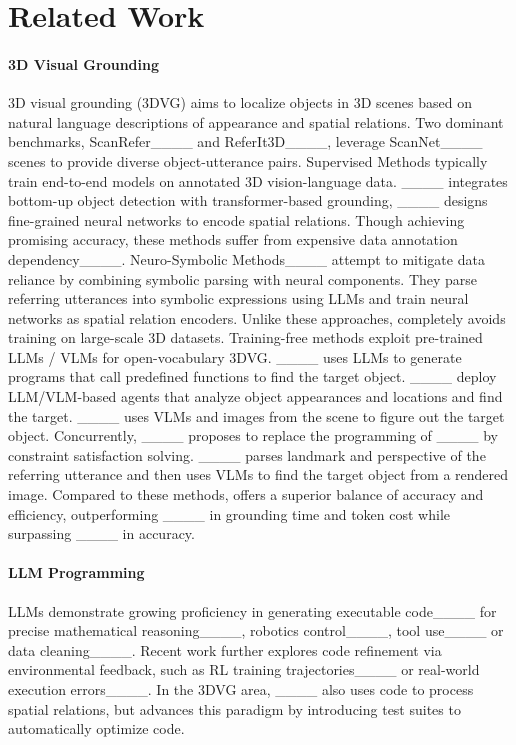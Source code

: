 \section{Related Work}
\paragraph{3D Visual Grounding}
3D visual grounding (3DVG) aims to localize objects in 3D scenes based on natural language descriptions of appearance and spatial relations. 
Two dominant benchmarks, ScanRefer____ and ReferIt3D____, leverage ScanNet____ scenes to provide diverse object-utterance pairs. 
Supervised Methods typically train end-to-end models on annotated 3D vision-language data. 
____ integrates bottom-up object detection with transformer-based grounding, 
____ designs fine-grained neural networks to encode spatial relations.
Though achieving promising accuracy, these methods suffer from expensive data annotation dependency____.
Neuro-Symbolic Methods____ attempt to mitigate data reliance by combining symbolic parsing with neural components. 
They parse referring utterances into symbolic expressions using LLMs and train neural networks as spatial relation encoders.
Unlike these approaches, \ourmethod completely avoids training on large-scale 3D datasets.
Training-free methods exploit pre-trained LLMs / VLMs for open-vocabulary 3DVG. 
____ uses LLMs to generate programs that call predefined functions to find the target object.
____ deploy LLM/VLM-based agents that analyze object appearances and locations and find the target.
____ uses VLMs and images from the scene to figure out the target object. 
Concurrently, ____ proposes to replace the programming of ____ by constraint satisfaction solving.
____ parses landmark and perspective of the referring utterance and then uses VLMs to find the target object from a rendered image.
Compared to these methods, \ourmethod offers a superior balance of accuracy and efficiency, outperforming ____ in grounding time and token cost while surpassing ____ in accuracy.

\paragraph{LLM Programming}
LLMs demonstrate growing proficiency in generating executable code____ for precise mathematical reasoning____, robotics control____, tool use____ or data cleaning____.
Recent work further explores code refinement via environmental feedback, such as RL training trajectories____ or real-world execution errors____.
In the 3DVG area, ____ also uses code to process spatial relations, but \ourmethod advances this paradigm by introducing test suites to automatically optimize code.

